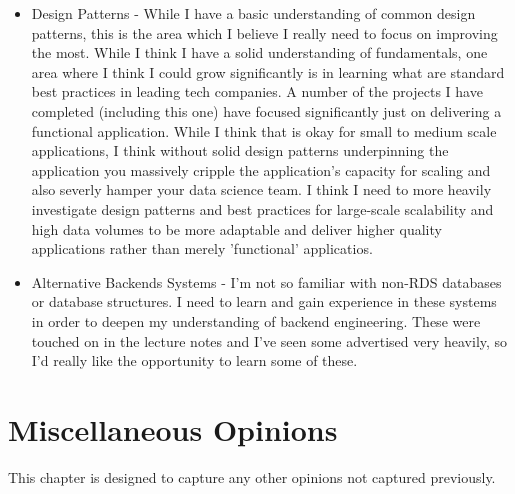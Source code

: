 \documentclass{scrreprt}
\begin{document}
\begin{itemize}
	\item Design Patterns - While I have a basic understanding of common design patterns, this is the area which I believe I really need to focus on improving the most. While I think I have a solid understanding of fundamentals, one area where I think I could grow significantly is in learning what are standard best practices in leading tech companies. A number of the projects I have completed (including this one) have focused significantly just on delivering a functional application. While I think that is okay for small to medium scale applications, I think without solid design patterns underpinning the application you massively cripple the application's capacity for scaling and also severly hamper your data science team. I think I need to more heavily investigate design patterns and best practices for large-scale scalability and high data volumes to be more adaptable and deliver higher quality applications rather than merely 'functional' applicatios. 
	\item Alternative Backends Systems  - I'm not so familiar with non-RDS databases or database structures. I need to learn and gain experience in these systems in order to deepen my understanding of backend engineering. These were touched on in the lecture notes and I've seen some advertised very heavily, so I'd really like the opportunity to learn some of these.
\end{itemize}

\pagebreak
\chapter{Miscellaneous Opinions}\label{MiscOpinions}
This chapter is designed to capture any other opinions not captured previously.
\end{document}
